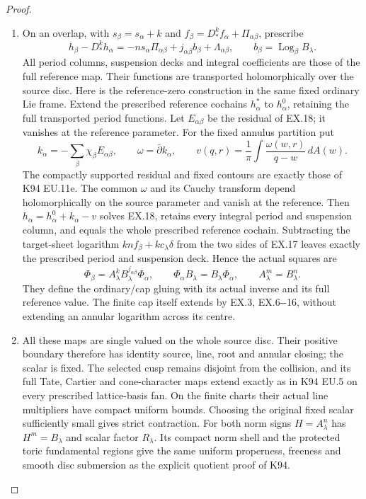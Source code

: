 \begin{proof}
\begin{enumerate}[label=\arabic*.]
\item On an overlap, with \(s_\beta=s_\alpha+k\) and
\(f_\beta=D_*^k f_\alpha+\Pi_{\alpha\beta}\), prescribe
\[
 h_\beta-D_*^k h_\alpha
   =-n s_\alpha\Pi_{\alpha\beta}
       +j_{\alpha\beta}b_\beta+\Lambda_{\alpha\beta},
 \qquad b_\beta=\operatorname{Log}_\beta B_\lambda.
 \tag{EX.18}
\]
All period columns, suspension decks and integral coefficients
are those of the full reference map. Their functions are
transported holomorphically over the source disc. Here is the reference-zero construction in the same fixed
ordinary Lie frame. Extend the prescribed reference cochains
\(h_\alpha^*\) to \(h_\alpha^0\), retaining the full
transported period functions. Let \(E_{\alpha\beta}\) be
the residual of EX.18; it vanishes at the reference parameter.
For the fixed annulus partition put
\[
 k_\alpha=-\sum_\beta\chi_\beta E_{\alpha\beta},
 \qquad \omega=\bar\partial k_\alpha,
 \qquad v(q,r)=\frac1\pi\int
                \frac{\omega(w,r)}{q-w}\,dA(w).
\]
The compactly supported residual and fixed contours are exactly
those of K94 EU.11e. The common \(\omega\) and its Cauchy
transform depend holomorphically on the source parameter and
vanish at the reference. Then
\(h_\alpha=h_\alpha^0+k_\alpha-v\) solves EX.18,
retains every integral period and suspension column, and equals
the whole prescribed reference cochain. Subtracting the target-sheet logarithm
\(kn f_\beta+kc_\lambda\delta\) from the two sides of
EX.17 leaves exactly the prescribed period and suspension deck.
Hence the actual squares are
\[
 \Phi_\beta=A_\lambda^k B_\lambda^{j_{\alpha\beta}}
                  \Phi_\alpha,\qquad
 \Phi_\alpha B_\lambda=B_\lambda\Phi_\alpha,
 \qquad A_\lambda^m=B_\lambda^n.
 \tag{EX.19}
\]
They define the ordinary/cap gluing with its actual inverse
and its full reference value. The finite cap itself extends
by EX.3, EX.6-\/-16, without extending an annular logarithm
across its centre.

\item All these maps are single valued on the whole source disc.
Their positive boundary therefore has identity source, line,
root and annular closing; the scalar is fixed. The selected
cusp remains disjoint from the collision, and its full Tate,
Cartier and cone-character maps extend exactly as in K94 EU.5
on every prescribed lattice-basis fan. On the finite charts
their actual line multipliers have compact uniform bounds.
Choosing the original fixed scalar sufficiently small gives
strict contraction. For both norm signs \(H=A_\lambda^n\)
has \(H^m=B_\lambda\) and scalar factor \(R_\lambda\).
Its compact norm shell and the protected toric fundamental
regions give the same uniform properness, freeness and smooth
disc submersion as the explicit quotient proof of K94.


\end{enumerate}
\end{proof}
